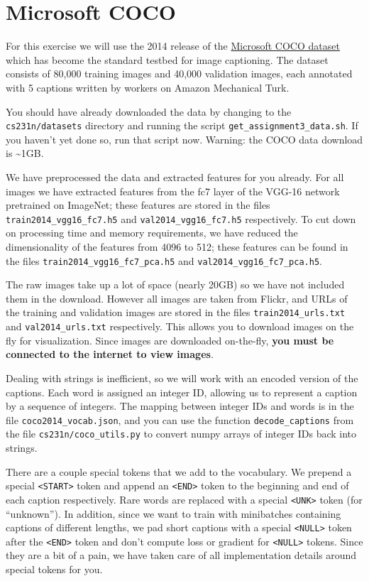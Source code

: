 \documentclass[11pt]{article}
\begin{document}
    \hypertarget{microsoft-coco}{%
\section{Microsoft COCO}\label{microsoft-coco}}

For this exercise we will use the 2014 release of the
\href{http://mscoco.org/}{Microsoft COCO dataset} which has become the
standard testbed for image captioning. The dataset consists of 80,000
training images and 40,000 validation images, each annotated with 5
captions written by workers on Amazon Mechanical Turk.

You should have already downloaded the data by changing to the
\texttt{cs231n/datasets} directory and running the script
\texttt{get\_assignment3\_data.sh}. If you haven't yet done so, run that
script now. Warning: the COCO data download is \textasciitilde{}1GB.

We have preprocessed the data and extracted features for you already.
For all images we have extracted features from the fc7 layer of the
VGG-16 network pretrained on ImageNet; these features are stored in the
files \texttt{train2014\_vgg16\_fc7.h5} and
\texttt{val2014\_vgg16\_fc7.h5} respectively. To cut down on processing
time and memory requirements, we have reduced the dimensionality of the
features from 4096 to 512; these features can be found in the files
\texttt{train2014\_vgg16\_fc7\_pca.h5} and
\texttt{val2014\_vgg16\_fc7\_pca.h5}.

The raw images take up a lot of space (nearly 20GB) so we have not
included them in the download. However all images are taken from Flickr,
and URLs of the training and validation images are stored in the files
\texttt{train2014\_urls.txt} and \texttt{val2014\_urls.txt}
respectively. This allows you to download images on the fly for
visualization. Since images are downloaded on-the-fly, \textbf{you must
be connected to the internet to view images}.

Dealing with strings is inefficient, so we will work with an encoded
version of the captions. Each word is assigned an integer ID, allowing
us to represent a caption by a sequence of integers. The mapping between
integer IDs and words is in the file \texttt{coco2014\_vocab.json}, and
you can use the function \texttt{decode\_captions} from the file
\texttt{cs231n/coco\_utils.py} to convert numpy arrays of integer IDs
back into strings.

There are a couple special tokens that we add to the vocabulary. We
prepend a special \texttt{\textless{}START\textgreater{}} token and
append an \texttt{\textless{}END\textgreater{}} token to the beginning
and end of each caption respectively. Rare words are replaced with a
special \texttt{\textless{}UNK\textgreater{}} token (for ``unknown'').
In addition, since we want to train with minibatches containing captions
of different lengths, we pad short captions with a special
\texttt{\textless{}NULL\textgreater{}} token after the
\texttt{\textless{}END\textgreater{}} token and don't compute loss or
gradient for \texttt{\textless{}NULL\textgreater{}} tokens. Since they
are a bit of a pain, we have taken care of all implementation details
around special tokens for you.
\end{document}
